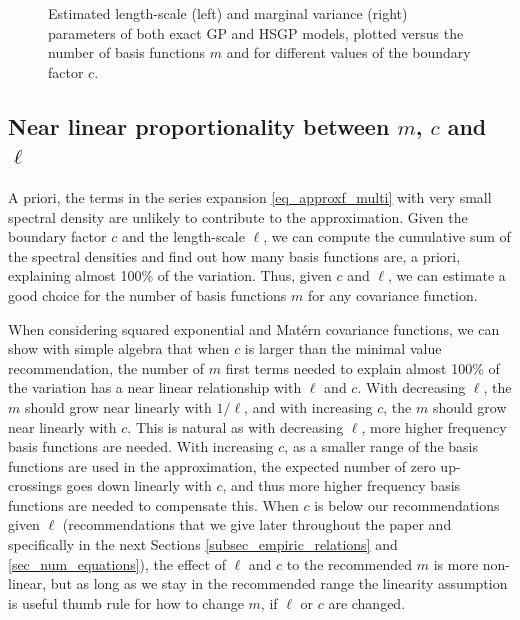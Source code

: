 \begin{figure} %
\centering
{}
\caption{Estimated length-scale (left) and marginal variance (right) parameters of both exact GP and HSGP models, plotted versus the number of basis functions $m$ and for different values of the boundary factor $c$.}
\label{fig4_lscale_vs_J}
\end{figure}

\subsection{Near linear proportionality between $m$, $c$ and $\ell$} \label{subsec_theoretic_linearity}

A priori, the terms in the series expansion \eqref{eq_approxf_multi} with very small spectral density are unlikely to contribute to the approximation. Given the boundary factor $c$ and the length-scale $\ell$, we can compute the cumulative sum of the spectral densities and find out how many basis functions are, a priori, explaining almost 100\% of the variation. Thus, given $c$ and $\ell$, we can estimate a good choice for the number of basis functions $m$ for any covariance function.

When considering squared exponential and Mat{\'e}rn covariance functions, we can show with simple algebra that when $c$ is larger than the minimal value recommendation, the number of $m$ first terms needed to explain almost 100\% of the variation has a near linear relationship with $\ell$ and $c$. With decreasing $\ell$, the $m$ should grow near linearly with $1/\ell$, and with increasing $c$, the $m$ should grow near linearly with $c$.
%
This is natural as with decreasing $\ell$, more higher frequency basis functions are needed. With increasing $c$, as a smaller range of the basis functions are used in the approximation, the expected number of zero up-crossings goes down linearly with $c$, and thus more higher frequency basis functions are needed to compensate this.
%
When $c$ is below our recommendations given $\ell$ ({\color{blue}recommendations that we give later throughout the paper and specifically in the next Sections \ref{subsec_empiric_relations} and \ref{sec_num_equations}}), the effect of $\ell$ and $c$ to the recommended $m$ is more non-linear, but as long as we stay in the recommended range the linearity assumption is useful thumb rule for how to change $m$, if $\ell$ or $c$ are changed.

